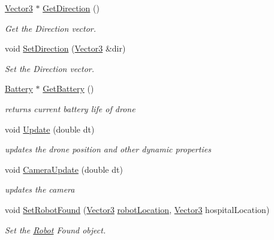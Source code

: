 \begin{DoxyCompactItemize}
\hyperlink{classVector3}{Vector3} $\ast$ \hyperlink{classDrone_ad81e02cd82137d51ce68f4698812c949}{Get\+Direction} ()
\begin{DoxyCompactList}\small\item\em Get the Direction vector. \end{DoxyCompactList}\item 
void \hyperlink{classDrone_a2ef1fbc3da17a8d599d2969990eb9614}{Set\+Direction} (\hyperlink{classVector3}{Vector3} \&dir)
\begin{DoxyCompactList}\small\item\em Set the Direction vector. \end{DoxyCompactList}\item 
\mbox{\label{classDrone_ab4d438ef285de22a8646bf3bcaba15da}} 
\hyperlink{classBattery}{Battery} $\ast$ \hyperlink{classDrone_ab4d438ef285de22a8646bf3bcaba15da}{Get\+Battery} ()
\begin{DoxyCompactList}\small\item\em returns current battery life of drone \end{DoxyCompactList}\item 
\mbox{\label{classDrone_abc6b79ccc7fdbc3bec8d539fc836c04d}} 
void \hyperlink{classDrone_abc6b79ccc7fdbc3bec8d539fc836c04d}{Update} (double dt)
\begin{DoxyCompactList}\small\item\em updates the drone position and other dynamic properties \end{DoxyCompactList}\item 
\mbox{\label{classDrone_ab50f73e8debbadb3e4d31fd2bab94768}} 
void \hyperlink{classDrone_ab50f73e8debbadb3e4d31fd2bab94768}{Camera\+Update} (double dt)
\begin{DoxyCompactList}\small\item\em updates the camera \end{DoxyCompactList}\item 
void \hyperlink{classDrone_a0e369b1d4bbc379387c8ea6a73d74525}{Set\+Robot\+Found} (\hyperlink{classVector3}{Vector3} \hyperlink{classDrone_ab52ab733570dcdb842df3b31ca4030ff}{robot\+Location}, \hyperlink{classVector3}{Vector3} hospital\+Location)
\begin{DoxyCompactList}\small\item\em Set the \hyperlink{classRobot}{Robot} Found object. \end{DoxyCompactList}\item 

\end{DoxyCompactItemize}
